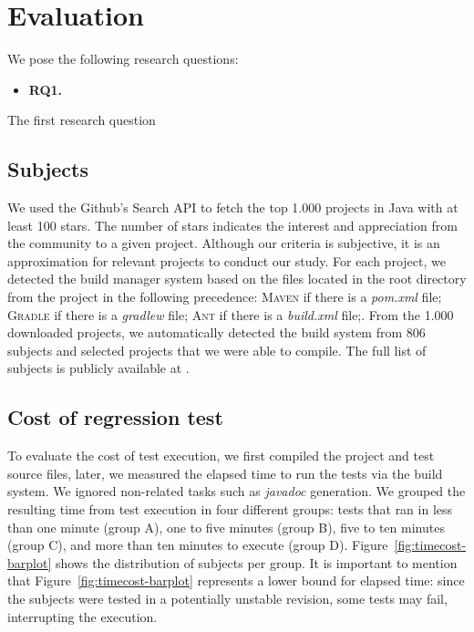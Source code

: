 \section{Evaluation}

We pose the following research questions:

\newcommand{\RQONE}{\textbf{RQ1.}}
\newcommand{\rqOne}{\RQONE{}~}

\begin{itemize}
    \item \rqOne
\end{itemize}

The first research question 

\subsection{Subjects}
\label{sec:subjects}

We used the Github's Search API to fetch the top 1.000 projects in
Java with at least 100 stars. The number of stars indicates the
interest and appreciation from the community to a given project.
 Although our
criteria is subjective, it is an approximation for relevant projects
to conduct our study. For each project, we detected the build manager
system based on the files located in the root directory from the
project in the following precedence: \textsc{Maven} if there is a
\emph{pom.xml} file; \textsc{Gradle} if there is a \emph{gradlew}
file; \textsc{Ant} if there is a \emph{build.xml} file;. From the
1.000 downloaded projects, we automatically detected the build system
from 806 subjects and selected  projects that we were able to
compile.  The full list of subjects is publicly available at
.

\subsection{Cost of regression test}
\label{sec:timecost}

To evaluate the cost of test execution, we first compiled the project
and test source files, later, we measured the elapsed time to run the
tests via the build system. We ignored non-related tasks such as
\emph{javadoc} generation.  We grouped the resulting time from test
execution in four different groups: tests that ran in less than one
minute (group A), one to five minutes (group B), five to ten minutes
(group C), and more than ten minutes to execute (group D).
Figure~\ref{fig:timecost-barplot} shows the distribution of subjects
per group. It is important to mention that
Figure~\ref{fig:timecost-barplot} represents a lower bound for elapsed
time: since the subjects were tested in a potentially unstable
revision, some tests may fail, interrupting the execution.

